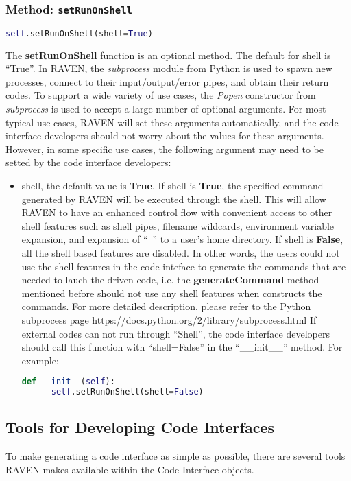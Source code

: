 \subsubsection{Method: \texttt{setRunOnShell}}
\label{subsubsec:setRunOnShell}
\begin{lstlisting}[language=python]
self.setRunOnShell(shell=True)
\end{lstlisting}
The \textbf{setRunOnShell} function is an optional method. The default for shell is ``True''.
In RAVEN, the \textit{subprocess} module from Python is used to spawn new processes, connect
to their input/output/error pipes, and obtain their return codes. To support a wide variety of
use cases, the \textit{Popen} constructor from \textit{subprocess} is used to accept a large number
of optional arguments. For most typical use cases, RAVEN will set these arguments automatically,
and the code interface developers should not worry about the values for these arguments. However, in
some specific use cases, the following argument may need to be setted by the code interface developers:
\begin{itemize}
  \item{shell}, the default value is \textbf{True}. If shell is \textbf{True}, the specified command
    generated by RAVEN will be executed through the shell. This will allow RAVEN to have an enhanced 
    control flow with convenient access to other shell features such as shell pipes, filename wildcards,
    environment variable expansion, and expansion of ``~'' to a user's home directory. If shell is
    \textbf{False}, all the shell based features are disabled. In other words, the users could not use the
    shell features in the code inteface to generate the commands that are needed to lauch the driven code,
    i.e. the \textbf{generateCommand} method mentioned before should not use any shell features when constructs
    the commands. For more detailed description, please refer to the Python subprocess page
    \url{https://docs.python.org/2/library/subprocess.html}
    \nb If external codes can not run through ``Shell'', the code interface developers should call this
    function with ``shell=False'' in the ``\_\_init\_\_'' method. For example:
    \begin{lstlisting}[language=python,showstringspaces=false]
    def __init__(self):
      self.setRunOnShell(shell=False)
    \end{lstlisting}
\end{itemize}

\subsection{Tools for Developing Code Interfaces}
To make generating a code interface as simple as possible, there are several tools RAVEN makes available within the Code Interface objects.

